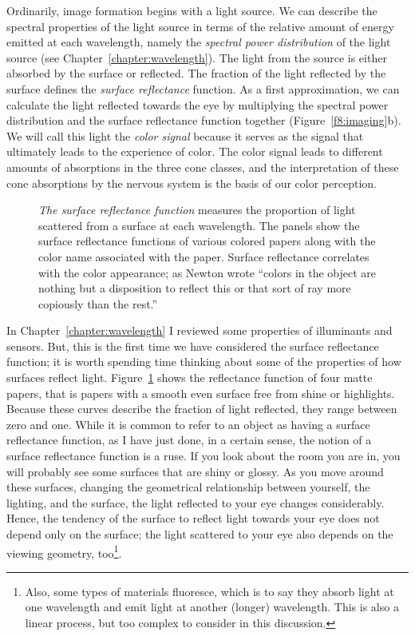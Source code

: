 Ordinarily, image formation begins with a light source.  We can
describe the spectral properties of the light source in terms of the
relative amount of energy emitted at each wavelength, namely the {\em
spectral power distribution} of the light source (see
Chapter~\ref{chapter:wavelength}).  The light from the source is
either absorbed by the surface or reflected.  The fraction of the
light reflected by the surface defines the {\em surface reflectance}
function.  As a first approximation, we can calculate the light
reflected towards the eye by multiplying the spectral power
distribution and the surface reflectance function together
(Figure~\ref{f8:imaging}b).  We will call this light the {\em color
signal} because it serves as the signal that ultimately leads to the
experience of color.  The color signal leads to different amounts of
absorptions in the three cone classes, and the interpretation of these
cone absorptions by the nervous system is the basis of our color
perception. 

\begin{figure}
\centerline{
}
\caption[Surface Reflectance Functions]{
{\em The surface reflectance function} measures the proportion of
light scattered from a surface at each wavelength.  The panels show
the surface reflectance functions of various colored papers along with
the color name associated with the paper.  Surface reflectance
correlates with the color appearance; as Newton wrote ``colors in the
object are nothing but a disposition to reflect this or that sort of
ray more copiously than the rest.''  }
\label{f8:surfR}
\end{figure}
In Chapter~\ref{chapter:wavelength} I reviewed some properties of
illuminants and sensors.  But, this is the first time we have
considered the surface reflectance function; it is worth spending time
thinking about some of the properties of how surfaces reflect light.
Figure~\ref{f8:surfR} shows the reflectance function of four matte
papers, that is papers with a smooth even surface free from shine or
highlights.  Because these curves describe the fraction of light
reflected, they range between zero and one.  While it is common to
refer to an object as having a surface reflectance function, as I have
just done, in a certain sense, the notion of a surface reflectance
function is a ruse.  If you look about the room you are in, you will
probably see some surfaces that are shiny or glossy.  As you move
around these surfaces, changing the geometrical relationship between
yourself, the lighting, and the surface, the light reflected to your
eye changes considerably.  Hence, the tendency of the surface to
reflect light towards your eye does not depend only on the surface;
the light scattered to your eye also depends on the viewing geometry,
too\footnote{Also, some types of materials fluoresce, which is to say
they absorb light at one wavelength and emit light at another (longer)
wavelength.  This is also a linear process, but too complex to
consider in this discussion.}.

